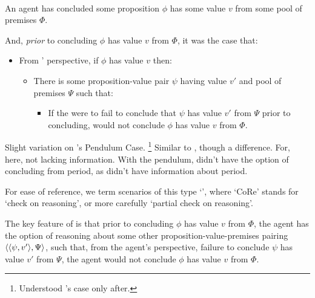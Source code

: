 \begin{note}
  \begin{scenarioType}
    \label{scenType:CoR}
    \mbox{ }

    An agent \vAgent{} has concluded some proposition \(\phi\) has some value \(v\) from some pool of premises \(\Phi\).

    And, \emph{prior} to concluding \(\phi\) has value \(v\) from \(\Phi\), it was the case that:
    \begin{itemize}
    \item
      From \vAgent{}' perspective, if \(\phi\) has value \(v\) then:
      \begin{itemize}
      \item
        There is some proposition-value pair \(\psi\) having value \(v'\) and pool of premises \(\Psi\) such that:
        \begin{itemize}
        \item
          If the \vAgent{} were to fail to conclude that \(\psi\) has value \(v'\) from \(\Psi\) prior to concluding, \vAgent{} would not conclude \(\phi\) has value \(v\) from \(\Phi\).
        \end{itemize}
      \end{itemize}
    \end{itemize}
    \vspace{-\baselineskip}
  \end{scenarioType}

  {
    \color{red}
    Slight variation on \citeauthor{Tolliver:1982us}'s Pendulum Case.%
    \footnote{
      Understood \citeauthor{Tolliver:1982us}'s case only after.
    }
    Similar to \citeauthor{Tolliver:1982us}, though a difference.
  For, here, not lacking information.
  With the pendulum, didn't have the option of concluding from period, as didn't have information about period.
  }

  For ease of reference, we term scenarios of this type `', where `CoRe' stands for `check on reasoning', or more carefully `partial check on reasoning'.

  The key feature of  is that prior to concluding \(\phi\) has value \(v\) from \(\Phi\), the agent has the option of reasoning about some other proposition-value-premises pairing \(\langle \langle \psi, v' \rangle, \Psi \rangle\), such that, from the agent's perspective, failure to conclude \(\psi\) has value \(v'\) from \(\Psi\), the agent would not conclude \(\phi\) has value \(v\) from \(\Phi\).


\end{note}
